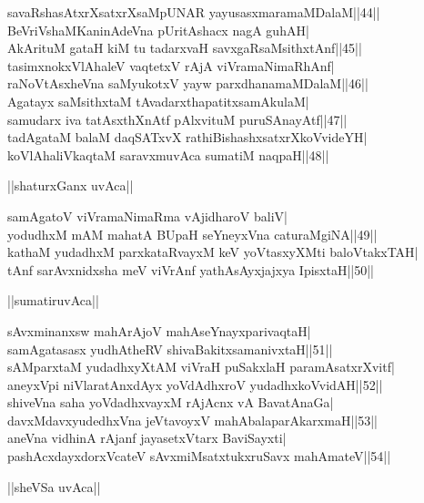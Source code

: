 \documentclass{article}
\begin{document}
savaRshasAtxrXsatxrXsaMpUNAR yayusasxmaramaMDalaM||44||\\
BeVriVshaMKaninAdeVna pUritAshacx nagA guhAH|\\
AkArituM gataH kiM tu tadarxvaH savxgaRsaMsithxtAnf||45||\\
tasimxnokxVlAhaleV vaqtetxV rAjA viVramaNimaRhAnf|\\
raNoVtAsxheVna saMyukotxV yayw parxdhanamaMDalaM||46||\\
Agatayx saMsithxtaM tAvadarxthapatitxsamAkulaM|\\
samudarx iva tatAsxthXnAtf pAlxvituM puruSAnayAtf||47||\\
tadAgataM balaM daqSATxvX rathiBishashxsatxrXkoVvideYH|\\
koVlAhaliVkaqtaM saravxmuvAca sumatiM naqpaH||48||\\

\begin{center}
||shaturxGanx uvAca||
\end{center}

samAgatoV viVramaNimaRma vAjidharoV baliV|\\
yodudhxM mAM mahatA BUpaH seYneyxVna caturaMgiNA||49||\\
kathaM yudadhxM parxkataRvayxM keV yoVtasxyXMti baloVtakxTAH|\\
tAnf sarAvxnidxsha meV viVrAnf yathAsAyxjajxya IpisxtaH||50||\\

\begin{center}
||sumatiruvAca||
\end{center}

sAvxminanxsw mahArAjoV mahAseYnayxparivaqtaH|\\
samAgatasasx yudhAtheRV shivaBakitxsamanivxtaH||51||\\
sAMparxtaM yudadhxyXtAM viVraH puSakxlaH paramAsatxrXvitf|\\
aneyxVpi niVlaratAnxdAyx yoVdAdhxroV yudadhxkoVvidAH||52||\\
shiveVna saha yoVdadhxvayxM rAjAcnx vA BavatAnaGa|\\
davxMdavxyudedhxVna jeVtavoyxV mahAbalaparAkarxmaH||53||\\
aneVna vidhinA rAjanf jayasetxVtarx BaviSayxti|\\
pashAcxdayxdorxVcateV sAvxmiMsatxtukxruSavx mahAmateV||54||\\

\begin{center}
||sheVSa uvAca||
\end{center}
\end{document}
